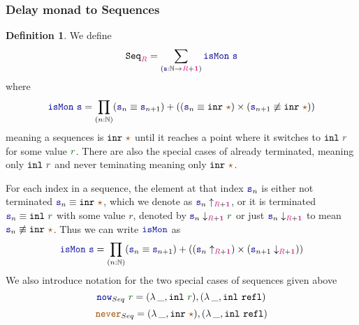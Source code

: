 \documentclass[twoside,11pt,openright]{report}
\theoremstyle{plain} %
\theoremstyle{definition}
\newtheorem{defn}[thm]{Definition}%
\theoremstyle{remark}
\newcommand*{\term}[1]{\textcolor{green!30!black}{#1}} %
\newcommand*{\type}[1]{\textcolor{magenta!90!black}{#1}}
\newcommand*{\unit}{\type{\textbf{1}}}
\newcommand*{\constant}[1]{\textcolor{orange!60!black}{\ensuremath{\mathtt{#1}}}}
\newcommand*{\function}[1]{\textcolor{blue!60!black}{\ensuremath{\mathtt{#1}}}}
\newcommand*{\typeformer}[1]{\ensuremath{\mathtt{#1}}}
\newcommand*{\unitelem}{\constant{\star}} %
\begin{document}
\subsubsection{Delay monad to Sequences}
\begin{defn}
  We define
  \begin{equation}
    \typeformer{Seq}_{\type{R}} = \sum_{(\function{s} : \mathbb{N} \rightarrow \type{R} + \unit)} \function{isMon}~\function{s}
  \end{equation}
  where
  \begin{equation}
    \function{isMon}~\function{s} = \prod_{(n : \mathbb{N})} (\function{s}_n \equiv \function{s}_{n+1})  + ((\function{s}_n \equiv \mathtt{inr}~\unitelem) \times (\function{s}_{n+1} \not\equiv \mathtt{inr}~\unitelem))
  \end{equation}
  meaning a sequences is \(\mathtt{inr}~\unitelem\) until it reaches a point where it switches to \(\mathtt{inl}~\term{r}\) for some value \(\term{r}\). There are also the special cases of already terminated, meaning only \(\mathtt{inl}~\term{r}\) and never teminating meaning only \(\mathtt{inr}~\unitelem\).
\end{defn}
\noindent For each index in a sequence, the element at that index \(\function{s}_n\) is either not terminated \(\function{s}_n \equiv \mathtt{inr}~\unitelem\), which we denote as \(\function{s}_n \uparrow_{\type{R} + \unit}\), or it is terminated \(\function{s}_n \equiv \mathtt{inl}~\term{r}\) with some value \(r\), denoted by \(\function{s}_n \downarrow_{\type{R} + \unit} \term{r}\) or just \(\function{s}_n \downarrow_{\type{R} + \unit}\) to mean \(\function{s}_n \not\equiv \mathtt{inr}~\unitelem\). Thus we can write \(\function{isMon}\) as
\begin{equation}
  \function{isMon}~\function{s} = \prod_{(n : \mathbb{N})} (\function{s}_n \equiv \function{s}_{n+1})  + ((\function{s}_n \uparrow_{\type{R} + \unit}) \times (\function{s}_{n+1} \downarrow_{\type{R} + \unit}))
\end{equation}
We also introduce notation for the two special cases of sequences given above
\begin{equation}
  \function{now}_{Seq}~\term{r} = (\lambda\,\_, \mathtt{inl}~\term{r}) , (\lambda\,\_, \mathtt{inl}~\mathtt{refl})
\end{equation}
\begin{equation}
  \constant{never}_{Seq} = (\lambda\,\_, \mathtt{inr}~\unitelem) , (\lambda\,\_, \mathtt{inl}~\mathtt{refl})
\end{equation}
\end{document}
